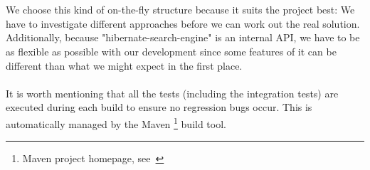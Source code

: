 \\\\
We choose this kind of on-the-fly structure because it suits the project best: We have to investigate different approaches before we can work out the real solution. Additionally, because "hibernate-search-engine" is an internal API, we have to be as flexible as possible with our development since some features of it can be different than what we might expect in the first place.
\\\\
It is worth mentioning that all the tests (including the integration tests) are executed during each build to ensure no regression bugs occur. This is automatically managed by the Maven \footnote{Maven project homepage, see~\cite{maven_homepage}} build tool.

\pagebreak
